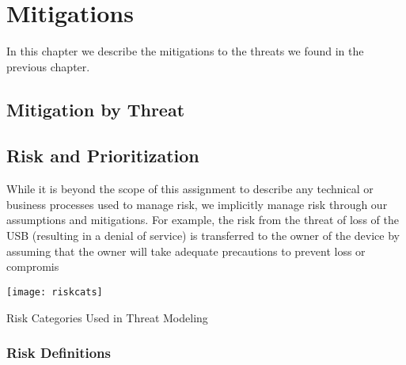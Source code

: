 \chapter{Mitigations}
\label{ch:mitigations}
In this chapter we describe the mitigations to the threats we found in
the previous chapter.

\section{Mitigation by Threat}

\section{Risk and Prioritization}
\label{sec:risk}
While it is beyond the scope of this assignment to describe any technical or business processes used to manage risk, we implicitly manage risk through our assumptions and mitigations.  For example, the risk from the threat of loss of the USB (resulting in a denial of service) is transferred to the owner of the device by assuming that the owner will take adequate precautions to prevent loss or compromis

\begin{marginfigure}
    \centering
    \texttt{[image: riskcats]}
    \caption{Risk Categories Used in Threat Modeling}
    \label{fig:riskcats}
\end{marginfigure}


\subsection{Risk Definitions}

